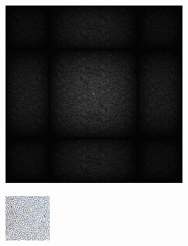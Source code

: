 \begin{figure}[H]
\begin{tcolorbox}[boxrule=4pt,sharp corners=downhill,title=Retargeting]
\begin{subfigure}[b]{0.2\textwidth}
        \includegraphics[width=\textwidth]{content/TemporalerAlg/Bilder/Retargeting/Spektren/Ausschnitt1.png}
        \label{pic:sorting_retarget_t1_FFT}
    \end{subfigure}
    \begin{subfigure}[b]{0.1\textwidth}
        \hspace*{1cm}
    \end{subfigure}
    \begin{subfigure}[b]{0.2\textwidth}
        \centering
        \includegraphics[width=\textwidth]{content/TemporalerAlg/Bilder/Retargeting/Ausschnitte/Ausschnitt5.png}

\end{subfigure}
\end{tcolorbox}
\end{figure}
